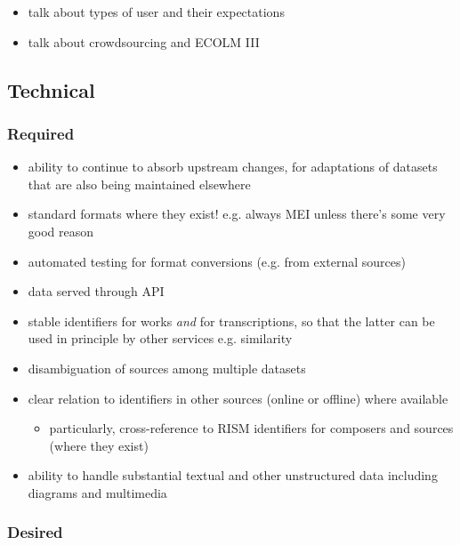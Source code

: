 \documentclass[sigconf, nonacm=true]{acmart}
\begin{document}
\begin{sloppypar}
  \begin{itemize}
  \item talk about types of user and their expectations
  \item talk about crowdsourcing and ECOLM III
  \end{itemize}

  
  \subsection{Technical}

  \subsubsection{Required}
  
  \begin{itemize}
  \item ability to continue to absorb upstream changes, for
    adaptations of datasets that are also being maintained elsewhere
  \item standard formats where they exist! e.g. always MEI unless
    there's some very good reason
  \item automated testing for format conversions (e.g. from external sources)
  \item data served through API
  \item stable identifiers for works {\em and} for transcriptions, so
    that the latter can be used in principle by other services
    e.g. similarity
  \item disambiguation of sources among multiple datasets
  \item clear relation to identifiers in other sources (online or
    offline) where available
    \begin{itemize}
    \item particularly, cross-reference to RISM identifiers for
      composers and sources (where they exist)
    \end{itemize}
  \item ability to handle substantial textual and other unstructured
    data including diagrams and multimedia

  \end{itemize}

  \subsubsection{Desired}
  

\end{sloppypar}
\end{document}
